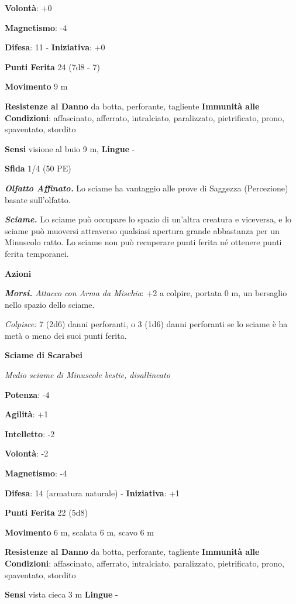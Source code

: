 \begin{multicols}{2}
\textbf{Volontà}: +0

\textbf{Magnetismo}: -4

\textbf{Difesa}: 11 - \textbf{Iniziativa}: +0

\textbf{Punti Ferita} 24 (7d8 - 7)

\textbf{Movimento} 9 m

\textbf{Resistenze al Danno} da botta, perforante, tagliente
\textbf{Immunità alle Condizioni}: affascinato, afferrato, intralciato,
paralizzato, pietrificato, prono, spaventato, stordito

\textbf{Sensi} visione al buio 9 m, 
\textbf{Lingue} -

\textbf{Sfida} 1/4 (50 PE)\smallskip

\emph{\textbf{Olfatto Affinato.}} Lo sciame ha vantaggio alle prove di
Saggezza (Percezione) basate sull'olfatto.

\emph{\textbf{Sciame.}} Lo sciame può occupare lo spazio di un'altra
creatura e viceversa, e lo sciame può muoversi attraverso qualsiasi
apertura grande abbastanza per un Minuscolo ratto. Lo sciame non può
recuperare punti ferita né ottenere punti ferita temporanei.

\smallskip\textbf{Azioni}

\emph{\textbf{Morsi.} Attacco con Arma da Mischia}: +2 a colpire,
portata 0 m, un bersaglio nello spazio dello sciame.

\emph{Colpisce:} 7 (2d6) danni perforanti, o 3 (1d6) danni perforanti se
lo sciame è ha metà o meno dei suoi punti ferita.

\textbf{Sciame di Scarabei}

\emph{Medio sciame di Minuscole bestie, disallineato}

\textbf{Potenza}: -4

\textbf{Agilità}: +1

\textbf{Intelletto}: -2

\textbf{Volontà}: -2

\textbf{Magnetismo}: -4

\textbf{Difesa}: 14 (armatura naturale) - \textbf{Iniziativa}: +1

\textbf{Punti Ferita} 22 (5d8)

\textbf{Movimento} 6 m, scalata 6 m, scavo 6 m

\textbf{Resistenze al Danno} da botta, perforante, tagliente
\textbf{Immunità alle Condizioni}: affascinato, afferrato, intralciato,
paralizzato, pietrificato, prono, spaventato, stordito

\textbf{Sensi} vista cieca 3 m \textbf{Lingue} -


\end{multicols}

